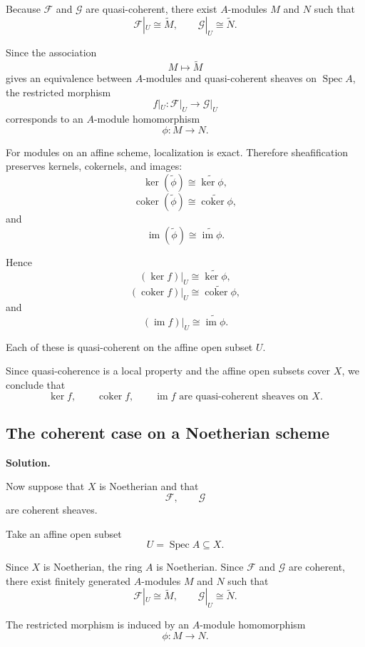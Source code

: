 Because \(\mathcal{F}\) and \(\mathcal{G}\) are quasi-coherent, there exist \(A\)-modules \(M\) and \(N\) such that
\[
\mathcal{F}|_U\cong \widetilde{M},
\qquad
\mathcal{G}|_U\cong \widetilde{N}.
\]

Since the association
\[
M\longmapsto \widetilde{M}
\]
gives an equivalence between \(A\)-modules and quasi-coherent sheaves on \(\operatorname{Spec} A\), the restricted morphism
\[
f|_U:\mathcal{F}|_U\longrightarrow \mathcal{G}|_U
\]
corresponds to an \(A\)-module homomorphism
\[
\phi:M\longrightarrow N.
\]

For modules on an affine scheme, localization is exact. Therefore sheafification preserves kernels, cokernels, and images:
\[
\ker(\widetilde{\phi})
\cong
\widetilde{\ker\phi},
\]
\[
\operatorname{coker}(\widetilde{\phi})
\cong
\widetilde{\operatorname{coker}\phi},
\]
and
\[
\operatorname{im}(\widetilde{\phi})
\cong
\widetilde{\operatorname{im}\phi}.
\]

Hence
\[
(\ker f)|_U
\cong
\widetilde{\ker\phi},
\]
\[
(\operatorname{coker} f)|_U
\cong
\widetilde{\operatorname{coker}\phi},
\]
and
\[
(\operatorname{im} f)|_U
\cong
\widetilde{\operatorname{im}\phi}.
\]

Each of these is quasi-coherent on the affine open subset \(U\).

Since quasi-coherence is a local property and the affine open subsets cover \(X\), we conclude that
\[
\boxed{
	\ker f,\qquad \operatorname{coker} f,\qquad \operatorname{im} f
	\text{ are quasi-coherent sheaves on }X.
}
\]

\subsection{The coherent case on a Noetherian scheme}

\textbf{Solution.}

Now suppose that \(X\) is Noetherian and that
\[
\mathcal{F},
\qquad
\mathcal{G}
\]
are coherent sheaves.

Take an affine open subset
\[
U=\operatorname{Spec} A\subseteq X.
\]

Since \(X\) is Noetherian, the ring \(A\) is Noetherian. Since \(\mathcal{F}\) and \(\mathcal{G}\) are coherent, there exist finitely generated \(A\)-modules \(M\) and \(N\) such that
\[
\mathcal{F}|_U\cong \widetilde{M},
\qquad
\mathcal{G}|_U\cong \widetilde{N}.
\]

The restricted morphism is induced by an \(A\)-module homomorphism
\[
\phi:M\longrightarrow N.
\]

